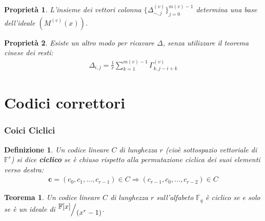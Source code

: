 \documentclass[mathserif]{beamer}
\def\quotient#1#2{%
   \raise1ex\hbox{$#1$}\Big/\lower1ex\hbox{$#2$}%
}
\newtheorem{definizione}{Definizione}
\newtheorem{teorema}{Teorema}
\newtheorem{prop}{Proprietà}
\begin{document}
\begin{frame}
    \begin{prop}
      L'insieme dei vettori colonna $\lbrace \Delta_{\sim, j}^{(v)} \rbrace_{j=0}^{m(v)-1}$ determina una base dell'ideale $(M^{(v)}(x))$.
    \end{prop}
    \begin{prop}
	Esiste un altro modo per ricavare $\Delta$, senza utilizzare il teorema cinese dei resti:
	\begin{align*}
	  \Delta_{i,j} = \frac{1}{r} \sum_{k=1}^{m(v)-1} \Gamma_{k,j-i+k}^{(v)}
	\end{align*}
    \end{prop}
\end{frame}


\section{Codici correttori}
\begin{frame}
  \frametitle{Coici Ciclici}
    \begin{definizione}
    Un codice lineare $C$ di lunghezza $r$ (cioè sottospazio vettoriale di $\mathbb{F}^{r}$) si dice {\bf ciclico} se è chiuso rispetto alla permutazione ciclica dei suoi elementi verso destra:
    \begin{align*}
	\mathbf{c} = (c_{0},c_{1}, \dots , c_{r-1}) \in C \Longrightarrow (c_{r-1},c_{0}, \dots , c_{r-2}) \in C
    \end{align*}
    \end{definizione}
    \begin{teorema}
      Un codice lineare $C$ di lunghezza $r$ sull'alfabeto $\mathbb{F}_{q}$ è ciclico se e solo se è un ideale di $\quotient{\mathbb{F} \lbrack x \rbrack  }{ (x^{r} - 1)}$.
    \end{teorema}
\end{frame}

\end{document}
